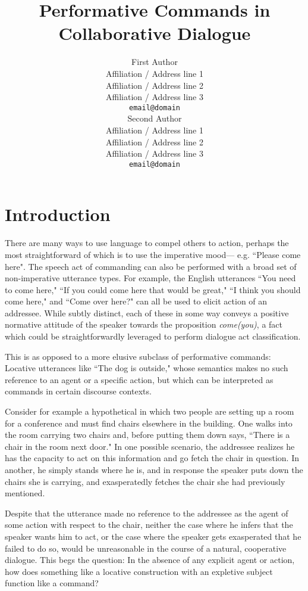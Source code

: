\documentclass[11pt,a4paper]{article}
\title{Performative Commands in Collaborative Dialogue}
\author{First Author \\
  Affiliation / Address line 1 \\
  Affiliation / Address line 2 \\
  Affiliation / Address line 3 \\
  {\tt email@domain} \\\And
  Second Author \\
  Affiliation / Address line 1 \\
  Affiliation / Address line 2 \\
  Affiliation / Address line 3 \\
  {\tt email@domain} \\}
\date{}
\begin{document}
\maketitle

\section{Introduction}

There are many ways to use language to compel others to action, perhaps the most straightforward of which is to use the imperative mood--- e.g. ``Please come here". The speech act of commanding can also be performed with a broad set of non-imperative utterance types. For example, the English utterances 
``You need to come here," ``If you could come here that would be great," ``I think you should come here," and ``Come over here?" can all be used to elicit action of an addressee. While subtly distinct, each of these in some way conveys a positive normative attitude of the speaker towards the proposition \textit{come(you)}, a fact which could be straightforwardly leveraged to perform dialogue act classification.

This is as opposed to a more elusive subclass of performative commands: Locative utterances like ``The dog is outside," whose semantics makes no such reference to an agent or a specific action, but which can be interpreted as commands in certain discourse contexts. 

Consider for example a hypothetical in which two people are setting up a room for a conference and must find chairs elsewhere in the building. One walks into the room carrying two chairs and, before putting them down says, ``There is a chair in the room next door." In one possible scenario, the addressee realizes he has the capacity to act on this information and go fetch the chair in question. In another, he simply stands where he is, and in response the speaker puts down the chairs she is carrying, and exasperatedly fetches the chair she had previously mentioned.

Despite that the utterance made no reference to the addressee as the agent of some action with respect to the chair, neither the case where he infers that the speaker wants him to act, or the case where the speaker gets exasperated that he failed to do so, would be unreasonable in the course of a natural, cooperative dialogue. This begs the question: In the absence of any explicit agent or action, how does something like a locative construction with an expletive subject function like a command? 
\end{document}
